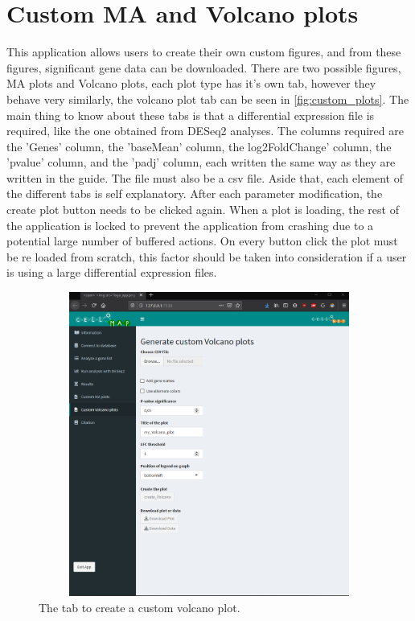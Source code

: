 \documentclass[11pt]{article}
\begin{document}
\section{Custom MA and Volcano plots \label{custom_plots}}
This application allows users to create their own custom figures, and from these figures, significant gene data can be downloaded. There are two possible figures, MA plots and Volcano plots, each plot type has it's own tab, however they behave very similarly, the volcano plot tab can be seen in \autoref{fig:custom_plots}. 
The main thing to know about these tabs is that a differential expression file is required, like the one obtained from DESeq2 analyses. The columns required are the 'Genes' column, the 'baseMean' column, the log2FoldChange' column, the 'pvalue' column, and the 'padj' column, each written the same way as they are written in the guide. The file must also be a csv file.
Aside that, each element of the different tabs is self explanatory. After each parameter modification, the create plot button needs to be clicked again. When a plot is loading, the rest of the application is locked to prevent the application from crashing due to a potential large number of buffered actions. On every button click the plot must be re loaded from scratch, this factor should be taken into consideration if a user is using a large differential expression files.

\begin{figure}[h!]
\centering
\includegraphics[width=15cm,height=10cm,keepaspectratio]{custom_volcano_tab.png}
\caption{The tab to create a custom volcano plot.}
\label{fig:custom_plots}
\end{figure}
\end{document}
